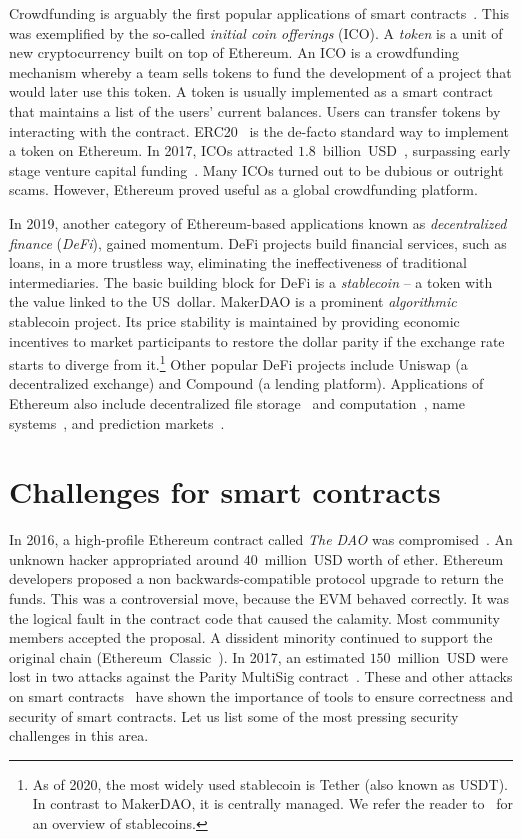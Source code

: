Crowdfunding is arguably the first popular applications of smart contracts~\cite{McAdams2017}.
This was exemplified by the so-called \textit{initial coin offerings} (ICO).
A \textit{token} is a unit of new cryptocurrency built on top of Ethereum.
An ICO is a crowdfunding mechanism whereby a team sells tokens to fund the development of a project that would later use this token.
A token is usually implemented as a smart contract that maintains a list of the users' current balances.
Users can transfer tokens by interacting with the contract.
ERC20~\cite{Victor2019} is the de-facto standard way to implement a token on Ethereum.
In 2017, ICOs attracted $1.8$~billion~USD~\cite{CoindeakICOTracker}, surpassing early stage venture capital funding~\cite{Sunnarborg2017}.
Many ICOs turned out to be dubious or outright scams.
However, Ethereum proved useful as a global crowdfunding platform.

In 2019, another category of Ethereum-based applications known as \textit{decentralized finance} (\textit{DeFi}), gained momentum.
DeFi projects build financial services, such as loans, in a more trustless way, eliminating the ineffectiveness of traditional intermediaries.
The basic building block for DeFi is a \textit{stablecoin} -- a token with the value linked to the US~dollar.
MakerDAO is a prominent \textit{algorithmic} stablecoin project.
Its price stability is maintained by providing economic incentives to market participants to restore the dollar parity if the exchange rate starts to diverge from it.\footnote{As of 2020, the most widely used stablecoin is Tether (also known as USDT). In contrast to MakerDAO, it is centrally managed. We refer the reader to~\cite{Clark2020,KlagesMundt2020} for an overview of stablecoins.}
Other popular DeFi projects include Uniswap (a decentralized exchange) and Compound (a lending platform).
Applications of Ethereum also include decentralized file storage~\cite{Storj} and computation~\cite{Golem}, name systems~\cite{ENS}, and prediction markets~\cite{Augur, Gnosis}.


\section{Challenges for smart contracts}

In 2016, a high-profile Ethereum contract called \textit{The DAO} was compromised~\cite{Sirer2016}.
An unknown hacker appropriated around $40$~million~USD worth of ether.
Ethereum developers proposed a non backwards-compatible protocol upgrade to return the funds.
This was a controversial move, because the EVM behaved correctly.
It was the logical fault in the contract code that caused the calamity.
Most community members accepted the proposal.
A dissident minority continued to support the original chain (Ethereum~Classic~\cite{EthereumClassic}).
In 2017, an estimated $150$~million~USD were lost in two attacks against the Parity MultiSig contract~\cite{Palladino2017}.
These and other attacks on smart contracts~\cite{Delmolino2016, Atzei2017} have shown the importance of tools to ensure correctness and security of smart contracts.
Let us list some of the most pressing security challenges in this area.

